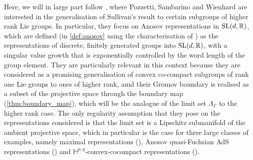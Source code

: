 \documentclass{report}
\begin{document}
Here, we will in large part follow \cite{pozzetti_anosov_2023}, where Pozzetti, Sambarino and Wienhard are interested in the generalisation of Sullivan's result to certain subgroups of higher rank Lie groups.
In particular, they focus on Anosov representations in $\operatorname{{\mathrm{SL}}}(d, \mathbb R)$, which are 
defined (in \cref{def:anosov} using the characterisation of \cite{kapovich2017anosov}) as the  representations of discrete, finitely generated groups into $\operatorname{{\mathrm{SL}}}(d, \mathbb R)$, with a singular value growth that is exponentially controlled by the word length of the group element.
They are particularly relevant in this context because they are considered as a promising generalisation of convex co-compact subgroups of rank one Lie groups to ones of higher rank,
amd their Gromov boundary is realised as a subset of the projective space through the boundary map (\cref{thm:boundary_map}), which will be the analogue of the limit set $\Lambda_\Gamma$ to the higher rank case.
The only regularity assumption that they pose on the representations considered is that the limit set is a Lipschitz submanifold of the ambient projective space, which in particular is the case for three large classes of examples, namely maximal representations (\cite{burger2010surface}), Anosov quasi-Fuchsian AdS representations (\cite{merigot2012anosov}) and $\mathbb H^{p,q}$-convex-cocompact representations (\cite{danciger2018convex}).
\end{document}

